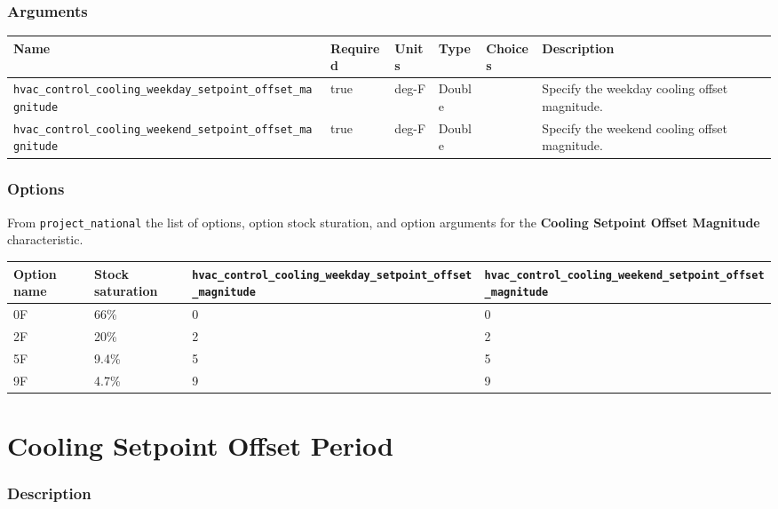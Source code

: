 \subsubsection{Arguments}\label{arguments-14}

\begin{longtable}[]{@{}llllll@{}}
\toprule\noalign{}
Name & Required & Units & Type & Choices & Description \\
\midrule\noalign{}
\endhead
\bottomrule\noalign{}
\endlastfoot
\texttt{hvac\_control\_cooling\_weekday\_setpoint\_offset\_magnitude} &
true & deg-F & Double & & Specify the weekday cooling offset
magnitude. \\
\texttt{hvac\_control\_cooling\_weekend\_setpoint\_offset\_magnitude} &
true & deg-F & Double & & Specify the weekend cooling offset
magnitude. \\
\end{longtable}

\subsubsection{Options}\label{options-24}

From \texttt{project\_national} the list of options, option stock
sturation, and option arguments for the \textbf{Cooling Setpoint Offset
Magnitude} characteristic.

\begin{longtable}[]{@{}llll@{}}
\toprule\noalign{}
Option name & Stock saturation &
\texttt{hvac\_control\_cooling\_weekday\_setpoint\_offset\_magnitude} &
\texttt{hvac\_control\_cooling\_weekend\_setpoint\_offset\_magnitude} \\
\midrule\noalign{}
\endhead
\bottomrule\noalign{}
\endlastfoot
0F & 66\% & 0 & 0 \\
2F & 20\% & 2 & 2 \\
5F & 9.4\% & 5 & 5 \\
9F & 4.7\% & 9 & 9 \\
\end{longtable}

\section{Cooling Setpoint Offset
Period}\label{cooling_setpoint_offset_period}

\subsubsection{Description}\label{description-25}

